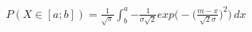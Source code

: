 \documentclass[preview]{standalone}
\begin{document}
\begin{align*}
P( X \in [a;b] ) = { \frac{1}{\sqrt{\pi}} } \int_b^a { { - \frac{1}{\sigma \sqrt{2}} } exp\Big(-{ \Big( \frac{m - x}{\sqrt{2} \sigma} \Big)^2 }\Big) } \, dx
\end{align*}
\end{document}
